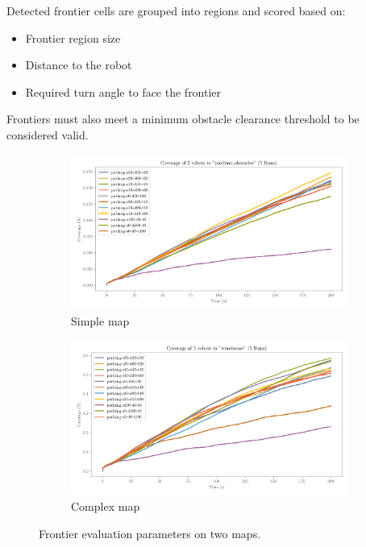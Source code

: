 Detected frontier cells are grouped into regions and scored based on:

\begin{itemize}
  \item Frontier region size
  \item Distance to the robot
  \item Required turn angle to face the frontier
\end{itemize}

Frontiers must also meet a minimum obstacle clearance threshold to be considered valid.

\begin{figure}[H]
    \centering
    \begin{subfigure}[b]{0.45\textwidth}
        \centering
        \includegraphics[width=\textwidth]{figures/frontier_eval_params_medium_obstacles.png}
        \caption{Simple map}
    \end{subfigure}
    \hfill
    \begin{subfigure}[b]{0.45\textwidth}
        \centering
        \includegraphics[width=\textwidth]{figures/frontier_eval_params_warehouse.png}
        \caption{Complex map}
    \end{subfigure}
    \caption{Frontier evaluation parameters on two maps.}
    \label{fig:frontier-eval-params}
\end{figure}

